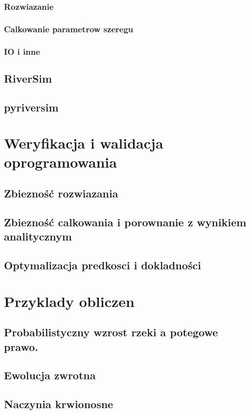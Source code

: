 \documentclass[]{pracamgr}
\begin{document}
\subsection{Rozwiazanie}
\subsection{Calkowanie parametrow szeregu}
\subsection{IO i inne}
\section{RiverSim}
\section{pyriversim}

\chapter{Weryfikacja i walidacja oprogramowania}
\section{Zbiezność rozwiazania}
\section{Zbiezność calkowania i porownanie z wynikiem analitycznym}
\section{Optymalizacja predkosci i dokladności}



\chapter{Przyklady obliczen}
\section{Probabilistyczny wzrost rzeki a potegowe prawo.}
\section{Ewolucja zwrotna}
\section{Naczynia krwionosne}
\end{document}
